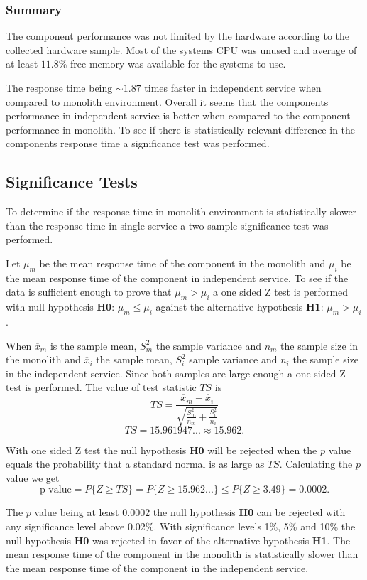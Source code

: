 \subsubsection{Summary}
The component performance was not limited by the hardware according to the collected hardware sample.
Most of the systems CPU was unused and average of at least $11.8\%$ free memory was available for the systems to use.

The response time being $\sim 1.87$ times faster in independent service when compared to monolith environment.
Overall it seems that the components performance in independent service is better when compared to the component performance in monolith.
To see if there is statistically relevant difference in the components response time a significance test was performed.

\subsection{Significance Tests}
To determine if the response time in monolith environment is statistically slower than the response time in single service a two sample significance test was performed.

Let $\mu_m$ be the mean response time of the component in the monolith and $\mu_i$ be the mean response time of the component in independent service.
To see if the data is sufficient enough to prove that $\mu_m > \mu_i$ a one sided Z test is performed with null hypothesis \textbf{H0}: $\mu_m \leq \mu_i$ against the alternative hypothesis \textbf{H1}: $\mu_m > \mu_i$.

When $\overline{x}_m$ is the sample mean, $S_m^2$ the sample variance and $n_m$ the sample size in the monolith 
and $\overline{x}_i$ the sample mean, $S_i^2$ sample variance and $n_i$ the sample size in the independent service.
Since both samples are large enough a one sided Z test is performed.
The value of test statistic $TS$ is
\[
TS=\frac{\overline{x}_m-\overline{x}_i}{\sqrt{\frac{S_m^2}{n_m}+\frac{S_i^2}{n_i}}}
\]
\[
TS=15.961947... \approx 15.962
.\]
 
With one sided Z test the null hypothesis \textbf{H0} will be rejected when the $p$ value 
equals the probability that a standard normal is as large as $TS$. Calculating the $p$ value we get %
\[
\text{p value} = P\{Z\geq TS\} = P\{Z\geq 15.962...\} \leq P\{Z\geq 3.49\} = 0.0002
.\]

The $p$ value being at least $0.0002$ the null hypothesis \textbf{H0} can be rejected with any significance level above $0.02\%$.
With significance levels 1\%, 5\% and 10\% the null hypothesis \textbf{H0} was rejected in favor of the alternative hypothesis \textbf{H1}.
The mean response time of the component in the monolith is statistically slower than the mean response time of the component in the independent service.

